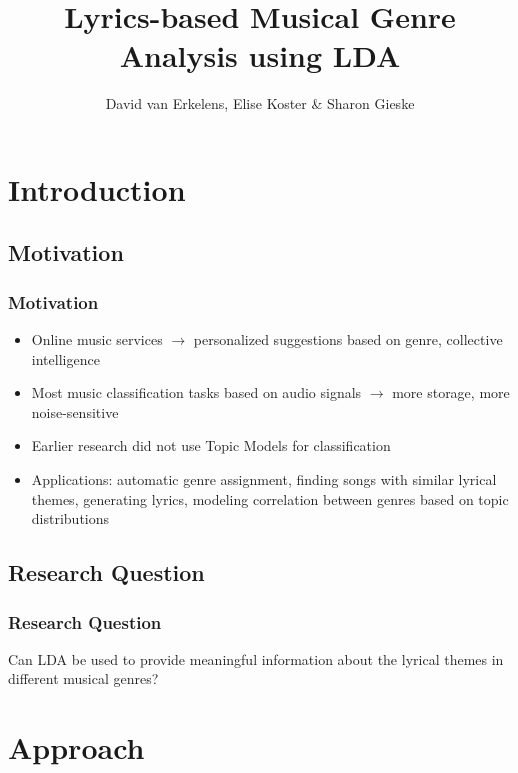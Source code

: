 \documentclass[t,ignorenonframetext]{beamer}
\title{Lyrics-based Musical Genre Analysis using LDA}
\author{David van Erkelens, Elise Koster \& Sharon Gieske}
\begin{document}
\frame{
\maketitle
}
\frame{
\tableofcontents
}

\section[Introduction]{Introduction}

\subsection{Motivation}
\begin{frame}
\frametitle{Motivation}
\begin{itemize}
	\item Online music services $\rightarrow$ personalized suggestions based on genre, collective intelligence
	\item Most music classification tasks based on audio signals $\rightarrow$ more storage, more noise-sensitive
	\item Earlier research did not use Topic Models for classification
	\item Applications: automatic genre assignment, finding songs with similar lyrical themes, generating lyrics, modeling correlation between genres based on topic distributions
\end{itemize}
\end{frame}

\subsection{Research Question}
\begin{frame}
\frametitle{Research Question}
Can LDA be used to provide meaningful information about the lyrical themes in different musical genres?


\end{frame}

\section[Approach]{Approach}
\end{document}
